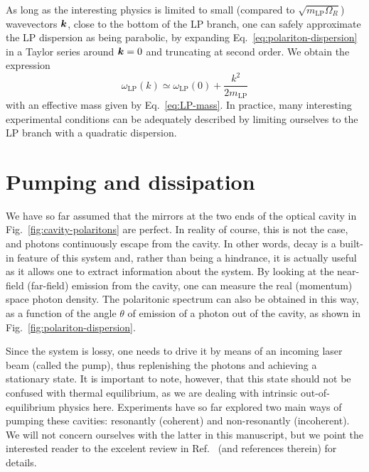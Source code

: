 As long as the interesting physics is limited to small (compared to
$\sqrt{m_{\text{LP}}\Omega_R}$) wavevectors $\bm{k}$, close to the bottom
of the LP branch, one can safely approximate the LP dispersion as
being parabolic, by expanding Eq.~\eqref{eq:polariton-dispersion} in a
Taylor series around $\bm{k} = 0$ and truncating at second order. We
obtain the expression
%
\begin{equation}\label{eq:parabolic-disp}
  \omega_{\text{LP}}(k) \simeq \omega_{\text{LP}}(0) + \frac{k^2}{2m_{\text{LP}}}
\end{equation}
% 
with an effective mass given by Eq.~\eqref{eq:LP-mass}. In practice,
many interesting experimental conditions can be adequately described
by limiting ourselves to the LP branch with a quadratic dispersion.


\section{Pumping and dissipation}
\label{sec:pumping}

We have so far assumed that the mirrors at the two ends of the optical
cavity in Fig.~\ref{fig:cavity-polaritons} are perfect. In reality of
course, this is not the case, and photons continuously escape from the
cavity. In other words, decay is a built-in feature of this
system and, rather than being a hindrance, it is actually useful as it
allows one to extract information about the system. By looking at
the near-field (far-field) emission from the cavity, one can measure
the real (momentum) space photon density. The polaritonic spectrum can
also be obtained in this way, as a function of the angle $\theta$ of
emission of a photon out of the cavity, as shown in
Fig.~\ref{fig:polariton-dispersion}.

Since the system is lossy, one needs to drive it by means of an
incoming laser beam (called the pump), thus replenishing the photons
and achieving a stationary state. It is important to note, however,
that this state should not be confused with thermal equilibrium, as we
are dealing with intrinsic out-of-equilibrium physics
here. Experiments have so far explored two main ways of pumping these
cavities: resonantly (coherent) and non-resonantly (incoherent). We
will not concern ourselves with the latter in this manuscript, but we
point the interested reader to the excelent review in
Ref.~\cite{Carusotto_2013} (and references therein) for details.

